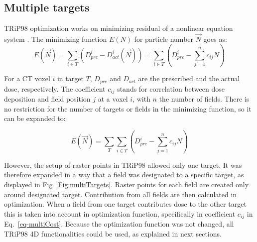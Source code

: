 \documentclass[type=dr, dr=rernat, accentcolor=tud7b,colorbacktitle, bigchapter, openright, twoside, 12pt ]{tudthesis}
\begin{document}
\subsection{Multiple targets}

TRiP98 optimization works on minimizing residual of a nonlinear equation system \cite{Kraemer2000a}. The minimizing function $E(N)$ for particle number $\vec{N}$ goes as:
\begin{equation}
\label{eq-costFunc}
 E(\vec{N}) = \sum_{i\in T} \left( D_{pre}^{i} - D_{act}^{i}(\vec{N})\right) = \sum_{i\in T} \left( D_{pre}^{i} -\sum_{j=1}^n c_{ij}N\right)
\end{equation}

For a CT voxel $i$ in target $T$, $ D_{pre}$ and $D_{act}$ are the prescribed and the actual dose, respectively. The coefficient $c_{ij}$ stands for correlation between dose deposition and field position $j$ at a voxel $i$, 
with $n$ the number of fields. There is no restriction for the number of targets or fields in the minimizing function, so it can be expanded to:

\begin{equation}
\label{eq-multiCost}
 E(\vec{N}) = \sum_{T} \sum_{i\in T} \left( D_{pre}^{i} -\sum_{j=1}^n c_{ij}N\right)
\end{equation}

However, the setup of raster points in TRiP98 allowed only one target. It was therefore expanded in a way that a field was designated to a specific target, as displayed in Fig~\ref{Fig:multiTargets}. 
Raster points for each field are created only around designated target. Contribution from all fields are then calculated in optimization. When a field from one target contributes 
dose to the other target this is taken into account in optimization function, specifically in coefficient $c_{ij}$ in Eq.~\ref{eq-multiCost}. Because the optimization function was not changed, 
all TRiP98 4D functionalities could be used, as explained in next sections.
\end{document}
